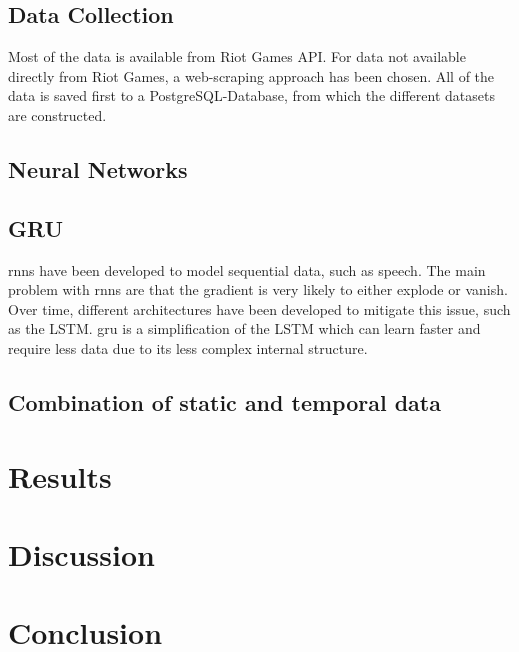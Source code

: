 \documentclass[12pt, a4paper, headinclude, twoside, plainheadsepline, open=right, numbers=noenddot, hidelinks, toc=listof, toc=bibliography]{scrreprt}
\begin{document}
\section{Data Collection}
\label{sec:datacoll}


Most of the data is available from Riot Games API. 
For data not available directly from Riot Games, a web-scraping approach has been chosen.
All of the data is saved first to a PostgreSQL-Database, from which the different datasets are constructed.


\section{Neural Networks}
\label{sec:nn}

\section{GRU}
\label{sec:gru}

\Acp{rnn} have been developed to model sequential data, such as speech. 
The main problem with \acp{rnn} are that the gradient is very likely to either explode or vanish.
Over time, different architectures have been developed to mitigate this issue, such as the LSTM.
\Ac{gru} is a simplification of the LSTM which can learn faster and require less data due to its less complex internal structure.

\section{Combination of static and temporal data}
\label{sec:combination}


\chapter{Results}
\label{chap:results}


\chapter{Discussion}
\label{chap:discussion}


\chapter{Conclusion}
\label{chap:conclusion}

%
%
%
\printbibliography






\listoffigures																			%
\listoftables																			%
\cleardoublepage{}	%
\printacronyms[heading={chapter*}, name={List of Abbreviations}]
\end{document}
